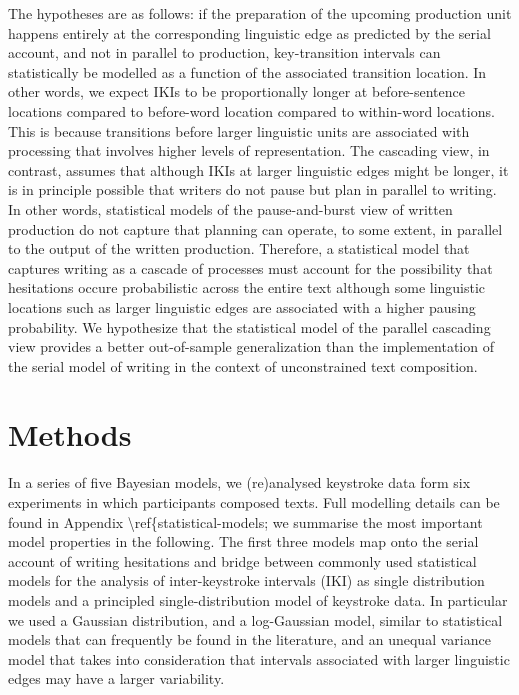 \documentclass[
  man,floatsintext]{apa7}
\begin{document}
The hypotheses are as follows: if the preparation of the upcoming production unit happens entirely at the corresponding linguistic edge as predicted by the serial account, and not in parallel to production, key-transition intervals can statistically be modelled as a function of the associated transition location. In other words, we expect IKIs to be proportionally longer at before-sentence locations compared to before-word location compared to within-word locations. This is because transitions before larger linguistic units are associated with processing that involves higher levels of representation. The cascading view, in contrast, assumes that although IKIs at larger linguistic edges might be longer, it is in principle possible that writers do not pause but plan in parallel to writing. In other words, statistical models of the pause-and-burst view of written production do not capture that planning can operate, to some extent, in parallel to the output of the written production. Therefore, a statistical model that captures writing as a cascade of processes must account for the possibility that hesitations occure probabilistic across the entire text although some linguistic locations such as larger linguistic edges are associated with a higher pausing probability. We hypothesize that the statistical model of the parallel cascading view provides a better out-of-sample generalization than the implementation of the serial model of writing in the context of unconstrained text composition.

\hypertarget{methods}{%
\section{Methods}\label{methods}}

In a series of five Bayesian models, we (re)analysed keystroke data form six experiments in which participants composed texts. Full modelling details can be found in Appendix \textbackslash ref\{statistical-models; we summarise the most important model properties in the following. The first three models map onto the serial account of writing hesitations and bridge between commonly used statistical models for the analysis of inter-keystroke intervals (IKI) as single distribution models and a principled single-distribution model of keystroke data. In particular we used a Gaussian distribution, and a log-Gaussian model, similar to statistical models that can frequently be found in the literature, and an unequal variance model that takes into consideration that intervals associated with larger linguistic edges may have a larger variability.
\end{document}
